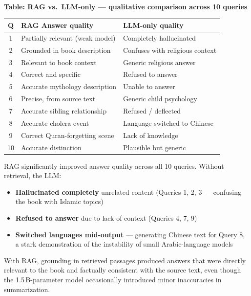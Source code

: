 \begin{center}
\textbf{Table: RAG vs.\ LLM-only --- qualitative comparison across 10 queries}\\[4pt]
\begin{tabularx}{\textwidth}{|c|X|X|}
\hline
\rowcolor{best}
\textbf{Q} & \textbf{RAG Answer quality} & \textbf{LLM-only quality} \\
\hline
1  & Partially relevant (weak model) & Completely hallucinated \\
\hline
2  & Grounded in book description    & Confuses with religious context \\
\hline
3  & Relevant to book context        & Generic religious answer \\
\hline
4  & Correct and specific            & Refused to answer \\
\hline
5  & Accurate mythology description  & Unable to answer \\
\hline
6  & Precise, from source text       & Generic child psychology \\
\hline
7  & Accurate sibling relationship   & Refused / deflected \\
\hline
8  & Accurate cholera event          & Language-switched to Chinese \\
\hline
9  & Correct Quran-forgetting scene  & Lack of knowledge \\
\hline
10 & Accurate distinction            & Plausible but generic \\
\hline
\end{tabularx}
\end{center}

RAG significantly improved answer quality across all 10 queries.
Without retrieval, the LLM:

\begin{itemize}
  \item \textbf{Hallucinated completely} unrelated content
        (Queries 1, 2, 3 --- confusing the book with Islamic topics)
  \item \textbf{Refused to answer} due to lack of context
        (Queries 4, 7, 9)
  \item \textbf{Switched languages mid-output} --- generating Chinese text
        for Query 8, a stark demonstration of the instability of small
        Arabic-language models
\end{itemize}

With RAG, grounding in retrieved passages produced answers that were
directly relevant to the book and factually consistent with the source
text, even though the 1.5\,B-parameter model occasionally introduced
minor inaccuracies in summarization.

